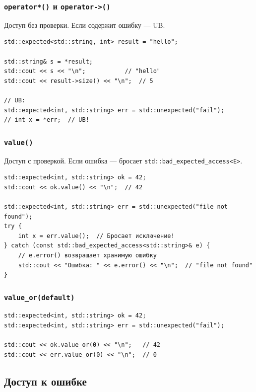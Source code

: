 \documentclass[a4paper,12pt]{article}
\begin{document}
\subsubsection{\texttt{operator*()} и \texttt{operator->()}}

Доступ без проверки. Если содержит ошибку --- UB.

\begin{lstlisting}
std::expected<std::string, int> result = "hello";

std::string& s = *result;
std::cout << s << "\n";           // "hello"
std::cout << result->size() << "\n";  // 5

// UB:
std::expected<int, std::string> err = std::unexpected("fail");
// int x = *err;  // UB!
\end{lstlisting}

\subsubsection{\texttt{value()}}

Доступ с проверкой. Если ошибка --- бросает \texttt{std::bad\_expected\_access<E>}.

\begin{lstlisting}
std::expected<int, std::string> ok = 42;
std::cout << ok.value() << "\n";  // 42

std::expected<int, std::string> err = std::unexpected("file not found");
try {
    int x = err.value();  // Бросает исключение!
} catch (const std::bad_expected_access<std::string>& e) {
    // e.error() возвращает хранимую ошибку
    std::cout << "Ошибка: " << e.error() << "\n";  // "file not found"
}
\end{lstlisting}

\subsubsection{\texttt{value\_or(default)}}

\begin{lstlisting}
std::expected<int, std::string> ok = 42;
std::expected<int, std::string> err = std::unexpected("fail");

std::cout << ok.value_or(0) << "\n";   // 42
std::cout << err.value_or(0) << "\n";  // 0
\end{lstlisting}

\subsection{Доступ к ошибке}
\end{document}

